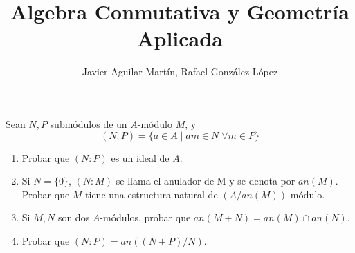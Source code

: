 \documentclass[twoside]{article}
\begin{document}
\title{Algebra Conmutativa y Geometría Aplicada}
\author{Javier Aguilar Martín, Rafael González López}
\maketitle

\begin{ejercicio}{2}
Sean $N,P$ submódulos de un $A$-módulo $M$, y $$(N:P) = \{a\in A\mid am\in N \;\forall m \in P\}$$
\begin{enumerate}
\item Probar que $(N:P)$ es un ideal de $A$.
\item Si $N=\{0\}$, $(N:M)$ se llama el anulador de M y se denota por $an(M)$. Probar que $M$ tiene una estructura natural de $(A/an(M))$-módulo.
\item Si $M,N$ son dos $A$-módulos, probar que $an(M+N)=an(M)\cap an(N)$.
\item Probar que $(N:P)=an((N+P)/N)$.
\end{enumerate}
\end{ejercicio}
\end{document}
